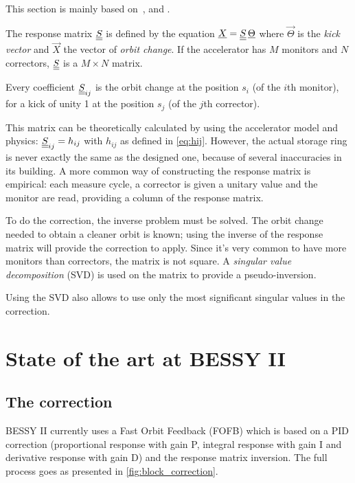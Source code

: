This section is mainly based on~\cite{book:wille}, \cite{art:decker-1991} and \cite{art:plouviez-1999}.

The response matrix $\underline{\underline{S}}$ is defined by the equation $\underline{X} = \underline{\underline{S}}\, \underline{\Theta}$ where $\vec{\Theta}$ is the \emph{kick vector} and $\vec{X}$ the vector of \emph{orbit change}. If the accelerator has $M$ monitors and $N$ correctors, $\underline{\underline{S}}$ is a $M \times N$ matrix.

Every coefficient $\underline{\underline{S}}_{ij}$ is the orbit change at the position $s_i$ (of the $i$th monitor), for a kick of unity 1 at the position $s_j$ (of the $j$th corrector).

This matrix can be theoretically calculated by using the accelerator model and physics: $\underline{\underline{S}}_{ij} = h_{ij}$ with $h_{ij}$ as defined in \cref{eq:hij}. However, the actual storage ring is never exactly the same as the designed one, because of several inaccuracies in its building. A more common way of constructing the response matrix is empirical: each measure cycle, a corrector is given a unitary value and the monitor are read, providing a column of the response matrix.

To do the correction, the inverse problem must be solved. The orbit change needed to obtain a cleaner orbit is known; using the inverse of the response matrix will provide the correction to apply. Since it's very common to have more monitors than correctors, the matrix is not square. A \emph{singular value decomposition} (SVD) is used on the matrix to provide a pseudo-inversion.

Using the SVD also allows to use only the most significant singular values in the correction.

\section{State of the art at BESSY II}

\subsection{The correction}
BESSY II currently uses a Fast Orbit Feedback (FOFB) which is based on a PID correction (proportional response with gain P, integral response with gain I and derivative response with gain D) and the response matrix inversion. The full process goes as presented in \cref{fig:block_correction}.

